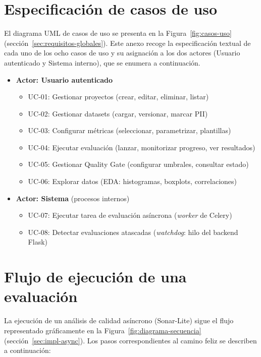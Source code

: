\section{Especificación de casos de uso}

El diagrama \ac{UML} de casos de uso se presenta en la
Figura~\ref{fig:casos-uso} (sección~\ref{sec:requisitos-globales}).  Este
anexo recoge la especificación textual de cada uno de los ocho casos de uso
y su asignación a los dos actores (Usuario autenticado y Sistema interno),
que se enumera a continuación.

\begin{itemize}
  \item \textbf{Actor: Usuario autenticado}
    \begin{itemize}
      \item UC-01: Gestionar proyectos (crear, editar, eliminar, listar)
      \item UC-02: Gestionar datasets (cargar, versionar, marcar \ac{PII})
      \item UC-03: Configurar métricas (seleccionar, parametrizar, plantillas)
      \item UC-04: Ejecutar evaluación (lanzar, monitorizar progreso, ver resultados)
      \item UC-05: Gestionar Quality Gate (configurar umbrales, consultar estado)
      \item UC-06: Explorar datos (\ac{EDA}: histogramas, boxplots, correlaciones)
    \end{itemize}
  \item \textbf{Actor: Sistema} (procesos internos)
    \begin{itemize}
      \item UC-07: Ejecutar tarea de evaluación asíncrona (\emph{worker} de Celery)
      \item UC-08: Detectar evaluaciones atascadas (\emph{watchdog}: hilo del backend Flask)
    \end{itemize}
\end{itemize}

\section{Flujo de ejecución de una evaluación}

La ejecución de un análisis de calidad asíncrono (Sonar-Lite) sigue el flujo
representado gráficamente en la Figura~\ref{fig:diagrama-secuencia}
(sección~\ref{sec:impl-async}). Los pasos correspondientes al camino feliz se
describen a continuación:

